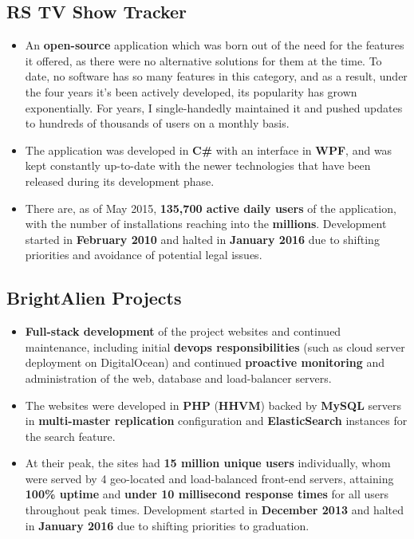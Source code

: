 \documentclass[11pt,a4paper,sans]{moderncv}
\begin{document}
	\subsection{RS TV Show Tracker}

	\begin{itemize}
		\item An \textbf{open-source} application which was born out of the need for the features it offered, as there were no alternative solutions for them at the time. To date, no software has so many features in this category, and as a result, under the four years it's been actively developed, its popularity has grown exponentially. For years, I single-handedly maintained it and pushed updates to hundreds of thousands of users on a monthly basis.

		\item The application was developed in \textbf{C\#} with an interface in \textbf{WPF}, and was kept constantly up-to-date with the newer technologies that have been released during its development phase.

		\item There are, as of May 2015, \textbf{135,700 active daily users} of the application, with the number of installations reaching into the \textbf{millions}. Development started in \textbf{February 2010} and halted in \textbf{January 2016} due to shifting priorities and avoidance of potential legal issues.
	\end{itemize}

	\subsection{BrightAlien Projects}

	\begin{itemize}
		\item \textbf{Full-stack development} of the project websites and continued maintenance, including initial \textbf{devops responsibilities} (such as cloud server deployment on DigitalOcean) and continued \textbf{proactive monitoring} and administration of the web, database and load-balancer servers.

		\item The websites were developed in \textbf{PHP} (\textbf{HHVM}) backed by \textbf{MySQL} servers in \textbf{multi-master replication} configuration and \textbf{ElasticSearch} instances for the search feature.

		\item At their peak, the sites had \textbf{15 million unique users} individually, whom were served by 4 geo-located and load-balanced front-end servers, attaining \textbf{100\% uptime} and \textbf{under 10 millisecond response times} for all users throughout peak times. Development started in \textbf{December 2013} and halted in \textbf{January 2016} due to shifting priorities to graduation.
	\end{itemize}
\end{document}
